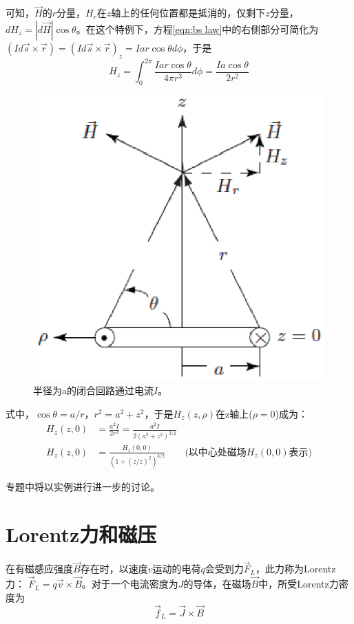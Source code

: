 可知，$\vec{H}$的$r$分量，$H_r$在$z$轴上的任何位置都是抵消的，仅剩下$z$分量，$dH_z=|d\vec{H}|\cos\theta$。在这个特例下，方程\ref{eqn:bs law}中的右侧部分可简化为
$(Id\vec{s}\times \vec{r})=(Id\vec{s}\times \vec{r})_z=Iar\cos\theta d\phi$，于是
\begin{equation}\label{eqn:bs law z1}
  H_z=\int_{0}^{2\pi}\frac{Iar\cos\theta}{4\pi r^3}d\phi=\frac{Ia\cos\theta}{2r^2}
\end{equation}
\begin{figure}[htbp]
  \centering
 \includegraphics[scale=0.7]{chpt3/figs/fig3.1.eps}
  \caption{半径为a的闭合回路通过电流$I$。}
\end{figure}

式中，$\cos\theta=a/r$，$r^2=a^2+z^2$，于是$H_z(z,\rho)$在z轴上($\rho=0$)成为：
\begin{subequations}\label{eqn:bs law z2}
	\begin{align}
H_z(z,0)&=\frac{a^2I}{2r^3}=\frac{a^2I}{2(a^2+z^2)^{3/2}} \\
H_z(z,0)&=\frac{H_z(0,0)}{(1+(z/z)^2)^{3/2}} \qquad\mbox{(以中心处磁场$H_z(0,0)$表示)}
\end{align}
\end{subequations}

专题中将以实例进行进一步的讨论。

\section{Lorentz力和磁压}
在有磁感应强度$\vec{B}$存在时，以速度$v$运动的电荷$q$会受到力$\vec{F}_L$，此力称为Lorentz力：
$\vec{F}_L=q\vec{v}\times \vec{B}$。对于一个电流密度为$J$的导体，在磁场$\vec{B}$中，所受Lorentz力密度为
\begin{equation}\label{eqn:lorentz force}
  \vec{f}_L=\vec{J}\times \vec{B}
\end{equation}

